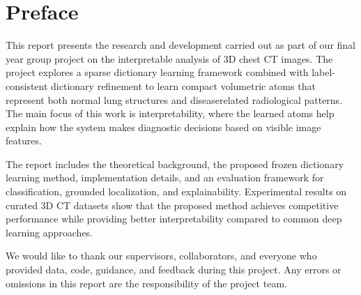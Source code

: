 ﻿
\chapter*{Preface}


This report presents the research and development carried out as part of our final year group project on the interpretable analysis of 3D chest CT images. The project explores a sparse dictionary learning framework combined with label-consistent dictionary refinement to learn compact volumetric atoms that represent both normal lung structures and diseaserelated radiological patterns. The main focus of this work is interpretability, where the learned atoms help explain how the system makes diagnostic decisions based on visible image features.

The report includes the theoretical background, the proposed frozen dictionary learning method, implementation details, and an evaluation framework for classification, grounded localization, and explainability. Experimental results on curated 3D CT datasets show that the proposed method achieves competitive performance while providing better interpretability compared to common deep learning approaches.

We would like to thank our supervisors, collaborators, and everyone who provided data, code, guidance, and feedback during this project. Any errors or omissions in this report are the responsibility of the project team.
